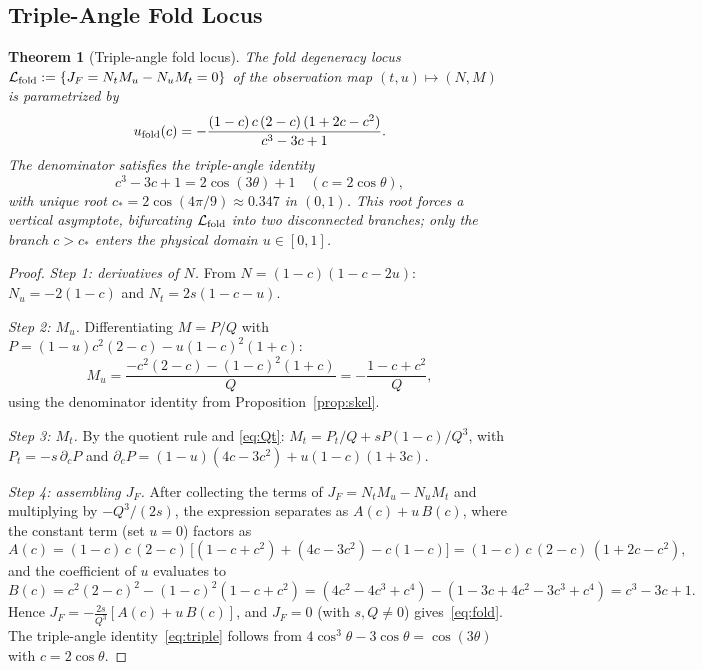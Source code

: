\documentclass[12pt]{article}
\newtheorem{theorem}{Theorem}[section]
\begin{document}
\subsection{Triple-Angle Fold Locus}
\label{ssec:fold}

\begin{theorem}[Triple-angle fold locus]
\label{thm:fold}
The fold degeneracy locus
$\mathcal{L}_{\rm fold}:=\{J_F = N_tM_u-N_uM_t = 0\}$
of the observation map $(t,u)\mapsto(N,M)$ is parametrized by
\begin{equation}
  u_{\rm fold}(c) = -\frac{(1-c)\,c\,(2-c)\,(1+2c-c^2)}{c^3-3c+1}.
  \label{eq:fold}
\end{equation}
The denominator satisfies the triple-angle identity
\begin{equation}
  c^3-3c+1 = 2\cos(3\theta)+1 \quad (c=2\cos\theta),
  \label{eq:triple}
\end{equation}
with unique root $c_*=2\cos(4\pi/9)\approx0.347$ in $(0,1)$.
This root forces a vertical asymptote, bifurcating $\mathcal{L}_{\rm fold}$
into two disconnected branches; only the branch $c>c_*$ enters the physical
domain $u\in[0,1]$.
\end{theorem}

\begin{proof}
\textit{Step 1: derivatives of $N$.}
From $N=(1-c)(1-c-2u)$: $N_u=-2(1-c)$ and $N_t=2s(1-c-u)$.

\textit{Step 2: $M_u$.}
Differentiating $M=P/Q$ with $P=(1-u)c^2(2-c)-u(1-c)^2(1+c)$:
\[
  M_u = \frac{-c^2(2-c)-(1-c)^2(1+c)}{Q} = -\frac{1-c+c^2}{Q},
\]
using the denominator identity from Proposition~\ref{prop:skel}.

\textit{Step 3: $M_t$.}
By the quotient rule and \eqref{eq:Qt}:
$M_t = P_t/Q + sP(1-c)/Q^3$,
with $P_t = -s\,\partial_c P$ and
$\partial_c P = (1-u)(4c-3c^2)+u(1-c)(1+3c)$.

\textit{Step 4: assembling $J_F$.}
After collecting the terms of $J_F = N_tM_u - N_uM_t$
and multiplying by $-Q^3/(2s)$, the expression separates as $A(c)+u\,B(c)$,
where the constant term (set $u=0$) factors as
\[
  A(c) = (1-c)\,c\,(2-c)\,
         \bigl[(1-c+c^2)+(4c-3c^2)-c(1-c)\bigr]
       = (1-c)\,c\,(2-c)\,(1+2c-c^2),
\]
and the coefficient of $u$ evaluates to
\[
  B(c) = c^2(2-c)^2 - (1-c)^2(1-c+c^2)
       = (4c^2-4c^3+c^4)-(1-3c+4c^2-3c^3+c^4)
       = c^3-3c+1.
\]
Hence $J_F = -\tfrac{2s}{Q^3}[A(c)+u\,B(c)]$,
and $J_F=0$ (with $s,Q\ne0$) gives~\eqref{eq:fold}.
The triple-angle identity~\eqref{eq:triple} follows from
$4\cos^3\!\theta-3\cos\theta=\cos(3\theta)$ with $c=2\cos\theta$.
\end{proof}
\end{document}

